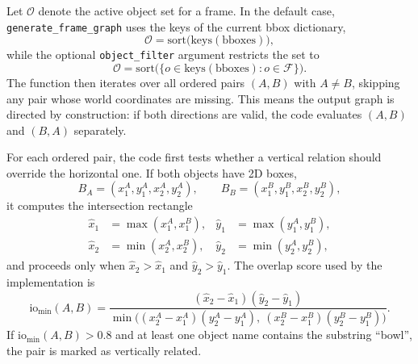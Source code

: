 \documentclass{article}
\begin{document}
Let $\mathcal{O}$ denote the active object set for a frame. In the default case, \texttt{generate\_frame\_graph} uses the keys of the current bbox dictionary,
\begin{equation}
\mathcal{O} = \mathrm{sort}\bigl(\mathrm{keys}(\mathrm{bboxes})\bigr),
\end{equation}
while the optional \texttt{object\_filter} argument restricts the set to
\begin{equation}
\mathcal{O} = \mathrm{sort}\bigl(\{o \in \mathrm{keys}(\mathrm{bboxes}) : o \in \mathcal{F}\}\bigr).
\end{equation}
The function then iterates over all ordered pairs $(A,B)$ with $A \neq B$, skipping any pair whose world coordinates are missing. This means the output graph is directed by construction: if both directions are valid, the code evaluates $(A,B)$ and $(B,A)$ separately.

For each ordered pair, the code first tests whether a vertical relation should override the horizontal one. If both objects have 2D boxes,
\begin{equation}
B_A = (x_1^A,y_1^A,x_2^A,y_2^A), \qquad
B_B = (x_1^B,y_1^B,x_2^B,y_2^B),
\end{equation}
it computes the intersection rectangle
\begin{equation}
\begin{aligned}
\hat{x}_1 &= \max(x_1^A,x_1^B), & \hat{y}_1 &= \max(y_1^A,y_1^B), \\
\hat{x}_2 &= \min(x_2^A,x_2^B), & \hat{y}_2 &= \min(y_2^A,y_2^B),
\end{aligned}
\end{equation}
and proceeds only when $\hat{x}_2 > \hat{x}_1$ and $\hat{y}_2 > \hat{y}_1$. The overlap score used by the implementation is
\begin{equation}
\mathrm{io}_{\min}(A,B) =
\frac{(\hat{x}_2-\hat{x}_1)(\hat{y}_2-\hat{y}_1)}
{\min\!\bigl((x_2^A-x_1^A)(y_2^A-y_1^A),\ (x_2^B-x_1^B)(y_2^B-y_1^B)\bigr)}.
\end{equation}
If $\mathrm{io}_{\min}(A,B) > 0.8$ and at least one object name contains the substring ``bowl'', the pair is marked as vertically related.
\end{document}
